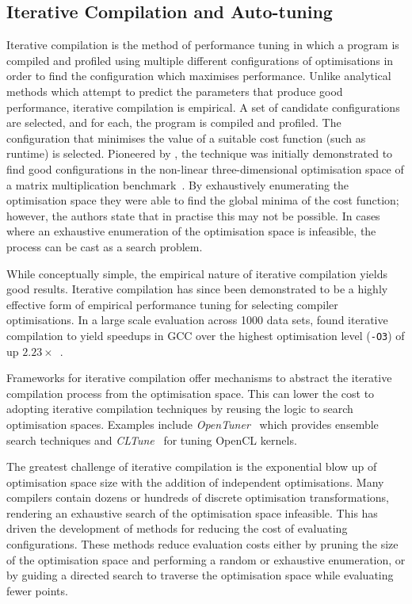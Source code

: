 \subsection{Iterative Compilation and Auto-tuning}

Iterative compilation is the method of performance tuning in which a program is compiled and profiled using multiple different configurations of optimisations in order to find the configuration which maximises performance. Unlike analytical methods which attempt to predict the parameters that produce good performance, iterative compilation is empirical. A set of candidate configurations are selected, and for each, the program is compiled and profiled. The configuration that minimises the value of a suitable cost function (such as runtime) is selected. Pioneered by \citeauthor{Bodin1998}, the technique was initially demonstrated to find good configurations in the non-linear three-dimensional optimisation space of a matrix multiplication benchmark~\cite{Bodin1998}. By exhaustively enumerating the optimisation space they were able to find the global minima of the cost function; however, the authors state that in practise this may not be possible. In cases where an exhaustive enumeration of the optimisation space is infeasible, the process can be cast as a search problem.

While conceptually simple, the empirical nature of iterative compilation yields good results. Iterative compilation has since been demonstrated to be a highly effective form of empirical performance tuning for selecting compiler optimisations.
In a large scale evaluation across 1000 data sets, \citeauthor{Chen2010} found iterative compilation to yield speedups in GCC over the highest optimisation level (\texttt{-O3}) of up $2.23\times$~\cite{Chen2010}.

Frameworks for iterative compilation offer mechanisms to abstract the iterative compilation process from the optimisation space. This can lower the cost to adopting iterative compilation techniques by reusing the logic to search optimisation spaces. Examples include \emph{OpenTuner}~\cite{Ansel2013} which provides ensemble search techniques and \emph{CLTune}~\cite{Nugteren2015} for tuning OpenCL kernels.

The greatest challenge of iterative compilation is the exponential blow up of optimisation space size with the addition of independent optimisations. Many compilers contain dozens or hundreds of discrete optimisation transformations, rendering an exhaustive search of the optimisation space infeasible. This has driven the development of methods for reducing the cost of evaluating configurations. These methods reduce evaluation costs either by pruning the size of the optimisation space and performing a random or exhaustive enumeration, or by guiding a directed search to traverse the optimisation space while evaluating fewer points.


